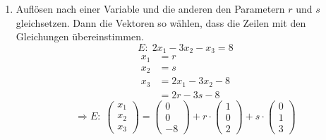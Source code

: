 \documentclass{article}
\begin{document}
\begin{enumerate}
    \item Auflösen nach einer Variable und die anderen den Parametern $r$ und $s$ gleichsetzen.
    Dann die Vektoren so wählen, dass die Zeilen mit den Gleichungen übereinstimmen.
    \[E:\; 2x_1 - 3x_2 -x_3 = 8\]
    \begin{align*}
        x_1 &= r \\
        x_2 &= s \\
        x_3 &= 2x_1 - 3x_2 - 8 \\
        &= 2r - 3s -8
    \end{align*}
    \[\Rightarrow E:\; \begin{pmatrix}x_1\\x_2\\x_3\end{pmatrix} = \begin{pmatrix}0\\0\\-8\end{pmatrix} + r \cdot \begin{pmatrix}1\\0\\2\end{pmatrix} + s \cdot \begin{pmatrix}0\\1\\3\end{pmatrix}\]
\end{enumerate}
\end{document}
